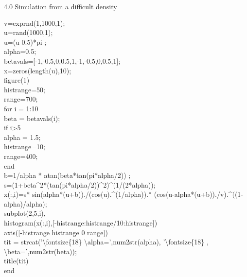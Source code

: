 \documentclass[twoside,twocolumn]{article}
\begin{document}
\begin{large}
4.0 Simulation from a difficult density
\end{large}
\newline
\begin{itshape}
v=exprnd(1,1000,1);\\
u=rand(1000,1);\\
u=(u-0.5)*pi ;\\
alpha=0.5;\\
betavals=[-1,-0.5,0,0.5,1,-1,-0.5,0,0.5,1];\\
x=zeros(length(u),10);\\

figure(1)\\
histrange=50;\\
range=700;\\

for i = 1:10\\
beta = betavals(i);\\
if i>5\\
    alpha = 1.5;\\
    histrange=10;\\
    range=400;\\
end \\
b=1/alpha * atan(beta*tan(pi*alpha/2)) ;\\
s=(1+beta\^{}2*(tan(pi*alpha/2))\^{}2)\^{}(1/(2*alpha));\\
x(:,i)=s* sin(alpha*(u+b))./(cos(u).\^{}(1/alpha)).* (cos(u-alpha*(u+b))./v).\^{}((1-alpha)/alpha); \\
subplot(2,5,i),\\
histogram(x(:,i),[-histrange:histrange/10:histrange])\\
axis([-histrange histrange 0 range])\\
tit = strcat('\textbackslash fontsize\{18\} \textbackslash alpha=',num2str(alpha), '\textbackslash fontsize\{18\} , \textbackslash beta=',num2str(beta));\\
title(tit)\\
end\\
\end{itshape}
\end{document}
